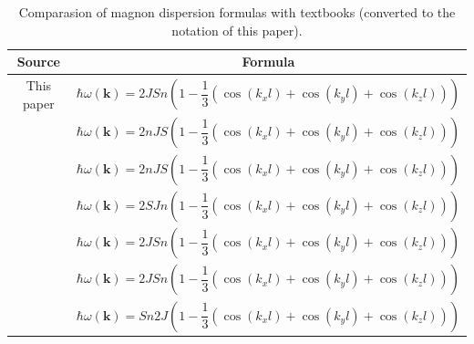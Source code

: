 \documentclass[a4paper,12pt]{article}
\begin{document}
        \begin{table}[H]
            \centering
            \caption{Comparasion of magnon dispersion formulas with textbooks (converted to the notation of this paper).}
            \label{tab:literature-review}
            \def\arraystretch{2.5}
            \begin{tabular}{|c|c|}
            \hline
            Source                             & Formula                                                                                                        \\ \hline
            This paper                         & $\hbar\omega(\mathbf{k}) = 2JSn\left(1 - \dfrac{1}{3}\left(\cos(k_xl) + \cos(k_yl) + \cos(k_zl)\right)\right)$ \\ \hline
            \cite{rezende2020fundamentals}     & $\hbar\omega(\mathbf{k}) = 2nJS\left(1 - \dfrac{1}{3}\left(\cos(k_xl) + \cos(k_yl) + \cos(k_zl)\right)\right)$ \\ \hline
            \cite{blundell2003magnetism}       & $\hbar\omega(\mathbf{k}) = 2nJS\left(1 - \dfrac{1}{3}\left(\cos(k_xl) + \cos(k_yl) + \cos(k_zl)\right)\right)$ \\ \hline
            \cite{gurevich1996magnetization}   & $\hbar\omega(\mathbf{k}) = 2SJn\left(1 - \dfrac{1}{3}\left(\cos(k_xl) + \cos(k_yl) + \cos(k_zl)\right)\right)$ \\ \hline
            \cite{simon2013oxford}             & $\hbar\omega(\mathbf{k}) = 2JSn\left(1 - \dfrac{1}{3}\left(\cos(k_xl) + \cos(k_yl) + \cos(k_zl)\right)\right)$ \\ \hline
            \cite{coey2010magnetism}           & $\hbar\omega(\mathbf{k}) = 2JSn\left(1 - \dfrac{1}{3}\left(\cos(k_xl) + \cos(k_yl) + \cos(k_zl)\right)\right)$ \\ \hline
            \cite{jensen1991rare}              & $\hbar\omega(\mathbf{k}) = Sn2J\left(1 - \dfrac{1}{3}\left(\cos(k_xl) + \cos(k_yl) + \cos(k_zl)\right)\right)$ \\ \hline
            \end{tabular}
            \end{table}

    

    

    \newpage
     
     
\end{document}

